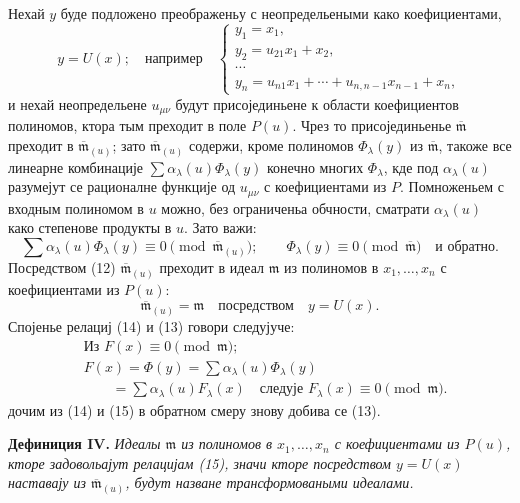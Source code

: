 \documentclass[11pt]{article}
\providecommand{\mideal}{\mathfrak m}
\providecommand{\zero}[1]{\equiv 0\pmod{#1}}
\begin{document}
Нехай $y$ буде подложено преображеньу с неопредельеными како коефициентами,
\begin{equation}
 y=U(x);\quad \text{например}\quad
 \begin{cases}
 y_1=x_1,\\
 y_2=u_{21}x_1+x_2,\\
 \cdots\\
 y_n=u_{n1}x_1+\cdots+u_{n,n-1}x_{n-1}+x_n,
 \end{cases}
\tag{12}
\end{equation}
и нехай неопредельене $u_{\mu\nu}$ будут присојединьене к области коефициентов полиномов, ктора тым преходит в поле $P(u)$. Чрез то присојединьенье $\overline{\mideal}$ преходит в $\overline{\mideal}_{(u)}$; зато $\overline{\mideal}_{(u)}$ содержи, кроме полиномов $\Phi_\lambda(y)$ из $\overline{\mideal}$, такоже все линеарне комбинације $\sum \alpha_\lambda(u)\Phi_\lambda(y)$ конечно многих $\Phi_\lambda$, кде под $\alpha_\lambda(u)$ разумејут се рационалне функције од $u_{\mu\nu}$ с коефициентами из $P$. Помноженьем с входным полиномом в $u$ можно, без ограниченьа обчности, сматрати $\alpha_\lambda(u)$ како степенове продукты в $u$. Зато важи:
\begin{equation}
 \sum \alpha_\lambda(u)\Phi_\lambda(y)\zero{\overline{\mideal}_{(u)}};
 \qquad
 \Phi_\lambda(y)\zero{\overline{\mideal}}\quad\text{и обратно}.
\tag{13}
\end{equation}
Посредством (12) $\overline{\mideal}_{(u)}$ преходит в идеал $\mideal$ из полиномов в $x_1,\ldots,x_n$ с коефициентами из $P(u)$:
\begin{equation}
 \overline{\mideal}_{(u)}=\mideal\quad \text{посредством}\quad y=U(x).
\tag{14}
\end{equation}
Спојенье релациј (14) и (13) говори следујуче:
\begin{equation}
\begin{aligned}
 &\text{Из } F(x)\zero{\mideal};\\
 &F(x)=\Phi(y)=\sum \alpha_\lambda(u)\Phi_\lambda(y)\\
 &\hspace{2em}=\sum \alpha_\lambda(u)F_\lambda(x)
 \quad\text{следује } F_\lambda(x)\zero{\mideal}.
\end{aligned}
\tag{15}
\end{equation}
дочим из (14) и (15) в обратном смеру знову добива се (13).

\medskip
\noindent\textbf{Дефиниция IV.} {\itshape Идеалы $\mideal$ из полиномов в $x_1,\ldots,x_n$ с коефициентами из $P(u)$, кторе задовольајут релацијам (15), значи кторе посредством $y=U(x)$ наставају из $\overline{\mideal}_{(u)}$, будут назване трансформоваными идеалами.}
\end{document}
